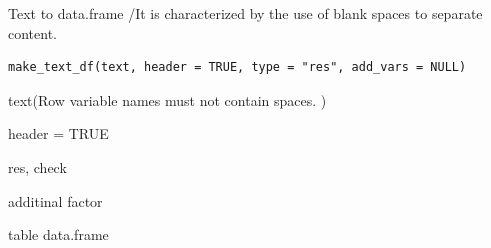 \documentclass[a4paper]{book}
\begin{document}
%
\begin{Description}
Text to data.frame /It is characterized by the use of blank spaces to separate content.
\end{Description}
%
\begin{Usage}
\begin{verbatim}
make_text_df(text, header = TRUE, type = "res", add_vars = NULL)
\end{verbatim}
\end{Usage}
%
\begin{Arguments}
\begin{ldescription}
\item[\code{text}] text(Row variable names must not contain spaces. )

\item[\code{header}] header = TRUE

\item[\code{type}] res, check

\item[\code{add\_vars}] additinal factor
\end{ldescription}
\end{Arguments}
%
\begin{Value}
table data.frame
\end{Value}
%
\end{document}
